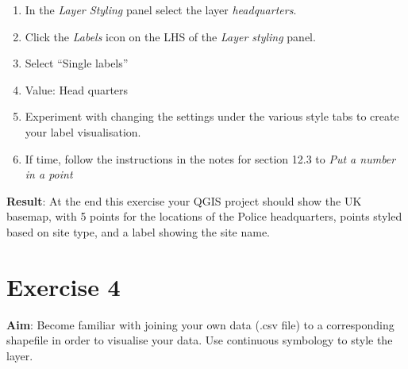 \documentclass{article}
\begin{document}
\begin{enumerate}
	\item In the \textit{Layer Styling} panel select the layer \textit{headquarters}.
	\item Click the \textit{Labels} icon on the LHS of the \textit{Layer styling} panel.
	\item Select “Single labels”
	\item Value: Head quarters
	\item Experiment with changing the settings under the various style tabs to create your label visualisation.
	\item If time, follow the instructions in the notes for section 12.3 to \textit{Put a number in a point}

\end{enumerate}

\textbf{Result}: At the end this exercise your QGIS project should show the UK basemap, with 5 points for the locations of the Police headquarters, points styled based on site type, and a label showing the site name. 

\section{Exercise 4}

\textbf{Aim}: Become familiar with joining your own data (.csv file) to a corresponding shapefile in order to visualise your data. Use continuous symbology to style the layer.\\
\end{document}
